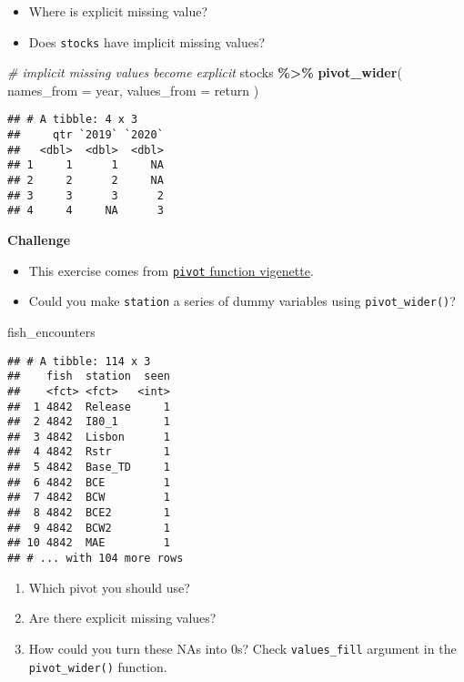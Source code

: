 \documentclass[
]{book}
\newenvironment{Shaded}{\begin{snugshade}}{\end{snugshade}}
\newcommand{\CommentTok}[1]{\textcolor[rgb]{0.56,0.35,0.01}{\textit{#1}}}
\newcommand{\DataTypeTok}[1]{\textcolor[rgb]{0.13,0.29,0.53}{#1}}
\newcommand{\KeywordTok}[1]{\textcolor[rgb]{0.13,0.29,0.53}{\textbf{#1}}}
\newcommand{\NormalTok}[1]{#1}
\newcommand{\OperatorTok}[1]{\textcolor[rgb]{0.81,0.36,0.00}{\textbf{#1}}}
\newcommand{\StringTok}[1]{\textcolor[rgb]{0.31,0.60,0.02}{#1}}
\begin{document}
\begin{itemize}
\item
  Where is explicit missing value?
\item
  Does \texttt{stocks} have implicit missing values?
\end{itemize}

\begin{Shaded}
\begin{Highlighting}[]
\CommentTok{\# implicit missing values become explicit}
\NormalTok{stocks }\OperatorTok{\%\textgreater{}\%}
\StringTok{  }\KeywordTok{pivot\_wider}\NormalTok{(}
    \DataTypeTok{names\_from =}\NormalTok{ year,}
    \DataTypeTok{values\_from =}\NormalTok{ return}
\NormalTok{  )}
\end{Highlighting}
\end{Shaded}

\begin{verbatim}
## # A tibble: 4 x 3
##     qtr `2019` `2020`
##   <dbl>  <dbl>  <dbl>
## 1     1      1     NA
## 2     2      2     NA
## 3     3      3      2
## 4     4     NA      3
\end{verbatim}

\textbf{Challenge}

\begin{itemize}
\item
  This exercise comes from \href{https://tidyr.tidyverse.org/articles/pivot.html}{\texttt{pivot} function vigenette}.
\item
  Could you make \texttt{station} a series of dummy variables using \texttt{pivot\_wider()}?
\end{itemize}

\begin{Shaded}
\begin{Highlighting}[]
\NormalTok{fish\_encounters}
\end{Highlighting}
\end{Shaded}

\begin{verbatim}
## # A tibble: 114 x 3
##    fish  station  seen
##    <fct> <fct>   <int>
##  1 4842  Release     1
##  2 4842  I80_1       1
##  3 4842  Lisbon      1
##  4 4842  Rstr        1
##  5 4842  Base_TD     1
##  6 4842  BCE         1
##  7 4842  BCW         1
##  8 4842  BCE2        1
##  9 4842  BCW2        1
## 10 4842  MAE         1
## # ... with 104 more rows
\end{verbatim}

\begin{enumerate}
\def\labelenumi{\arabic{enumi}.}
\item
  Which pivot you should use?
\item
  Are there explicit missing values?
\item
  How could you turn these NAs into 0s? Check \texttt{values\_fill} argument in the \texttt{pivot\_wider()} function.
\end{enumerate}
\end{document}
